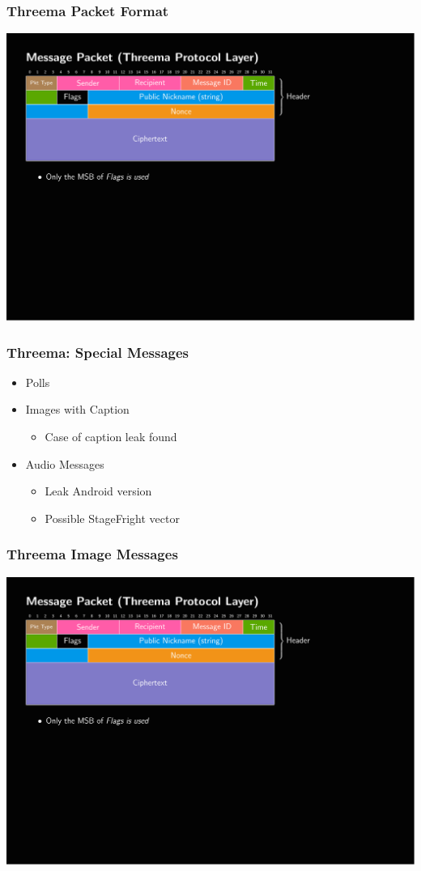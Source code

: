 \documentclass[
	aspectratio=169,
	xetex,
]{beamer}
\begin{document}
\begin{frame}
	\frametitle{Threema Packet Format}

	\includegraphics[page=1,clip,trim={.99cm 8cm 3.2cm 1.8cm},width=\textwidth]{out/messages.pdf}

\end{frame}

\begin{frame}
	\frametitle{Threema: Special Messages}
	\begin{itemize}
		\item Polls
		\item Images with Caption
			\begin{itemize}
				\item Case of caption leak found
			\end{itemize}
		\item Audio Messages
			\begin{itemize}
				\item Leak Android version
				\item Possible StageFright vector
			\end{itemize}
	\end{itemize}
\end{frame}

\begin{frame}
	\frametitle{Threema Image Messages}
	\includegraphics[page=4,clip,trim={.99cm 7.5cm 3.2cm 1.8cm},width=\textwidth]{out/messages.pdf}
\end{frame}
\end{document}
